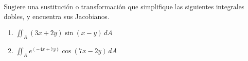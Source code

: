 Sugiere una sustitución o transformación que simplifique las siguientes integrales dobles, y encuentra sus Jacobianos.

\begin{enumerate}[label=(\alph*), itemsep=0.4em, topsep=0.5em]
	\item $\displaystyle \iint_R (3x + 2y) \sin(x - y)\, dA$
	\item $\displaystyle \iint_R e^{(-4x + 7y)} \cos(7x - 2y)\, dA$
\end{enumerate}

